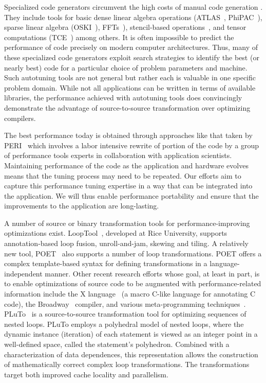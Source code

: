 \documentclass[11pt]{article}
\begin{document}
Specialized code generators circumvent the high costs of manual code generation . They include tools for basic dense linear algebra operations (ATLAS~\cite{WN147}, PhiPAC~\cite{bilmes97optimizing,phipacwww}), sparse linear algebra (OSKI~\cite{vuduc05}), FFTs~\cite{FFTW,Spiral}), stencil-based operations~\cite{kamil06}, and tensor computations (TCE~\cite{TCE}) among others.  It is often impossible to predict the performance of code precisely on modern computer architectures. Thus, many of these specialized code generators exploit search strategies to identify the best (or nearly best) code for a particular choice of problem parameters and machine. Such autotuning tools are not general but rather each is valuable in one specific problem domain. While not all applications can be written in terms of available libraries, the performance achieved with autotuning tools does convincingly demonstrate the advantage of source-to-source transformation over optimizing compilers.

The best performance today is obtained through approaches like that taken by PERI~\cite{PERI} which involves a labor intensive rewrite of portion of the code by a group of performance tools experts in collaboration with application scientists. Maintaining performance of the code as the application and hardware evolves means that the tuning process may need to be repeated. Our efforts aim to capture this performance tuning expertise in a way that can be integrated into the application. We will thus enable performance portability and ensure that the improvements to the application are long-lasting.

A number of source or binary transformation tools for performance-improving optimizations exist. LoopTool~\cite{LoopTool}, developed at Rice University, supports annotation-based loop fusion, unroll-and-jam, skewing and tiling.  A relatively new tool, POET~\cite{POET} also supports a number of loop transformations. POET offers a complex template-based syntax for defining transformations in a language-independent manner. Other recent research efforts whose goal, at least in part, is to enable optimizations of source code to be augmented with performance-related information include the X language~\cite{XLanguage} (a macro C-like language for annotating C code), the Broadway~\cite{broadway} compiler, and various meta-programming techniques~\cite{veldhuizen95,weise93,kiczales91,chiba95}. PLuTo~\cite{Pluto,uday08cc} is a source-to-source transformation tool for optimizing sequences of nested loops. PLuTo employs a polyhedral model of nested loops, where the dynamic instance (iteration) of each statement is viewed as an integer point in a well-defined space, called the statement's polyhedron. Combined with a characterization of data dependences, this representation allows the construction of mathematically correct complex loop transformations. The transformations target both improved cache locality and parallelism.
\end{document}
